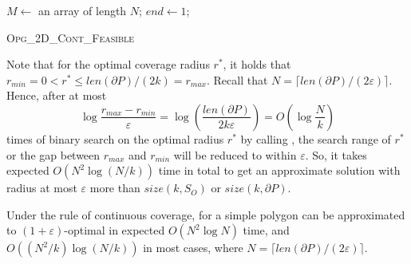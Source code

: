 \begin{algorithm} 
  \DontPrintSemicolon
  \vspace{2mm}

   {\Return{\True}}
  \vspace{1.5mm}

  \vspace{1.5mm}

  $M\leftarrow$ an array of length $N$; $end\leftarrow 1$;\;
  \vspace{1.5mm}

  \vspace{1.5mm}

  \vspace{1.5mm}

  \Return{\False}
  \caption{\textsc{Opg\_2D\_Cont\_Feasible}}\label{algo:osg-cont}
\end{algorithm}



Note that for the optimal coverage radius $r^*$, it holds that $r_{min} = 
0 < r^* \leq {len(\partial P)}/({2k}) = r_{max}$. 
Recall that $N=\lceil len(\partial P)/(2\varepsilon)\rceil$.
Hence, after at most 
\[
  \log\frac{r_{max} - r_{min}}{\varepsilon} = \log(\frac{len(\partial P)}{2k\varepsilon})  = O(\log\frac{N}{k} )
\]
times of binary search on the optimal radius $r^*$ by calling \algoptfeasi, 
the search range of $r^*$ or the gap between $r_{max}$ and $r_{min}$ will 
be reduced to within $\varepsilon$. So, it takes expected $O(N^2 \log (N/k))$ 
time in total to get an approximate solution with radius at most $\varepsilon$ 
more than $size(k, S_O)$ or $size(k, \partial P)$.
\begin{theorem}%
    Under the rule of continuous coverage, \opgt for a simple 
		polygon can be approximated to $(1 + \varepsilon)$-optimal in expected 
		$O(N^2\log N)$ time, and $O(({N^2}/{k} )\log(N/k))$ in most cases,
    where $N=\lceil{len(\partial P)}/({2\varepsilon})\rceil$.
\end{theorem}

